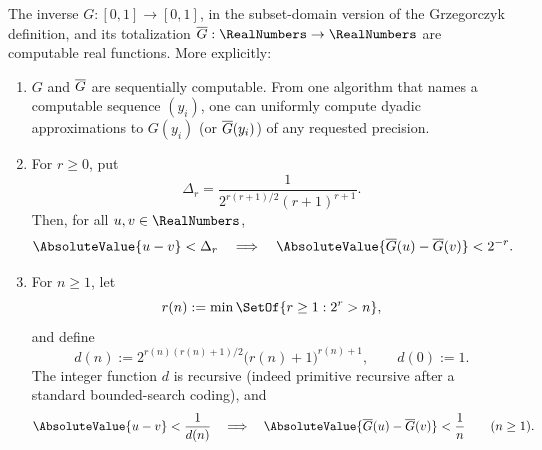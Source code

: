 \begin{theorem}\label{co:thm:main}
The inverse $G:[0,1]\to[0,1]$, in the subset-domain version of the
Grzegorczyk definition, and its totalization $\InvT:\RealNumbers\to\RealNumbers$ are computable
real functions.  More explicitly:
\begin{enumerate}
\item $G$ and $\overline G$ are sequentially computable.  From one algorithm that
      names a computable sequence $(y_i)$, one can uniformly compute dyadic
      approximations to $G(y_i)$ (or $\overline G(y_i)$) of any requested precision.
\item For $r\ge0$, put
      \begin{equation}\label{co:eq:Delta-intro}
       \Delta_r=\frac{1}{2^{r(r+1)/2}(r+1)^{r+1}}.
      \end{equation}
      Then, for all $u,v\in\RealNumbers$,
      \begin{equation}\label{co:eq:explicit-dyadic-modulus-intro}
       \AbsoluteValue{u-v}<\Delta_r
       \quad\Longrightarrow\quad
       \AbsoluteValue{\InvT(u)-\InvT(v)}<2^{-r}.
      \end{equation}
\item For $n\ge1$, let
      \begin{equation}\label{co:eq:r-of-n}
       r(n):=\min\SetOf{r\ge1:2^r>n},
      \end{equation}
      and define
      \begin{equation}\label{co:eq:d-of-n-intro}
       d(n):=2^{r(n)(r(n)+1)/2}\bigl(r(n)+1\bigr)^{r(n)+1},
       \qquad d(0):=1.
      \end{equation}
      The integer function $d$ is recursive (indeed primitive recursive after
      a standard bounded-search coding), and
      \begin{equation}\label{co:eq:wikipedia-modulus-intro}
       \AbsoluteValue{u-v}<\frac1{d(n)}
       \quad\Longrightarrow\quad
       \AbsoluteValue{\InvT(u)-\InvT(v)}<\frac1n
       \qquad(n\ge1).
      \end{equation}
\end{enumerate}
\end{theorem}

